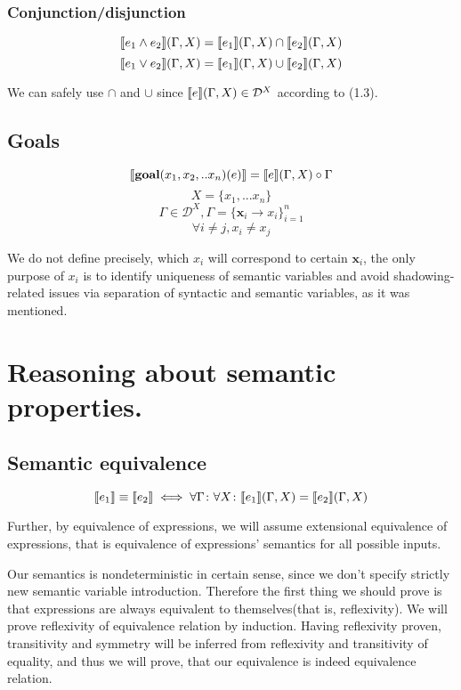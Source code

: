 \documentclass[fleqn]{article}
\begin{document}
\subsubsection{ Conjunction/disjunction }
\[\llbracket e_1 \wedge e_2\rrbracket(\Gamma, X) = \llbracket e_1\rrbracket(\Gamma, X) \cap \llbracket e_2\rrbracket(\Gamma, X)\]
\[\llbracket e_1 \vee e_2\rrbracket(\Gamma, X) = \llbracket e_1\rrbracket(\Gamma, X) \cup \llbracket e_2\rrbracket(\Gamma, X)\]

We can safely use \(\cap\) and \(\cup\) since \(\llbracket e\rrbracket(\Gamma,X) \in \mathcal{D}^X\) according to (1.3).

\newpage

\subsection{Goals}
\[ \llbracket\textrm{\textbf{goal}}(x_1,x_2,..x_n)(e)\rrbracket = \llbracket e\rrbracket(\Gamma, X) \circ \Gamma \]
\[X=\{x_1,...x_n\}\]
\[\Gamma \in \mathcal{D}^X, \Gamma = \{\mathbf{x}_i \rightarrow x_i\}_{i=1}^n\]
\[\forall i \neq j, x_i \neq x_j \]

We do not define precisely, which \(x_i\) will correspond to certain \(\mathbf{x}_i\), the only purpose of \(x_i\) is to identify uniqueness of semantic variables and avoid shadowing-related issues via separation of syntactic and semantic variables, as it was mentioned.
\newpage
\section{Reasoning about semantic properties.}
\subsection{Semantic equivalence}
\[\llbracket e_1\rrbracket \equiv \llbracket e_2\rrbracket \iff \forall \Gamma \colon \forall X \colon \llbracket e_1\rrbracket(\Gamma, X) = \llbracket e_2\rrbracket(\Gamma, X)\]

Further, by equivalence of expressions, we will assume extensional equivalence of expressions, that is equivalence of expressions' semantics for all possible inputs.

Our semantics is nondeterministic in certain sense, since we don't specify strictly new semantic variable introduction. Therefore the first thing we should prove is that expressions are always equivalent to themselves(that is, reflexivity). We will prove reflexivity of equivalence relation by induction. Having reflexivity proven, transitivity and symmetry will be inferred from reflexivity and transitivity of equality, and thus we will prove, that our equivalence is indeed equivalence relation.
\end{document}
